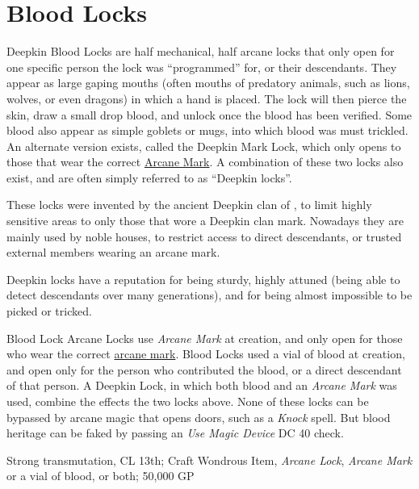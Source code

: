\section{Blood Locks}
\label{sec:Blood Locks}

Deepkin Blood Locks are half mechanical, half arcane locks that only open for
one specific person the lock was ``programmed'' for, or their descendants. They
appear as large gaping mouths (often mouths of predatory animals, such as lions,
wolves, or even dragons) in which a hand is placed. The lock will then pierce
the skin, draw a small drop blood, and unlock once the blood has been verified.
Some blood also appear as simple goblets or mugs, into which blood was must
trickled. An alternate version exists, called the Deepkin Mark Lock, which only
opens to those that wear the correct \hyperref[sec:Arcane Marks]{Arcane Mark}.
A combination of these two locks also exist, and are often simply referred to
as ``Deepkin locks''.

These locks were invented by the ancient Deepkin clan of ,
to limit highly sensitive areas to only those that wore a Deepkin clan mark.
Nowadays they are mainly used by noble houses, to restrict access to direct
descendants, or trusted external members wearing an arcane mark.

Deepkin locks have a reputation for being sturdy, highly attuned (being able
to detect descendants over many generations), and for being almost impossible
to be picked or tricked.

\begin{35e}{Blood Lock}
  Arcane Locks use \emph{Arcane Mark} at creation, and only open for those who
  wear the correct \hyperref[sec:Arcane Marks]{arcane mark}. Blood Locks used
  a vial of blood at creation, and open only for the person who contributed
  the blood, or a direct descendant of that person. A Deepkin Lock, in which
  both blood and an \emph{Arcane Mark} was used, combine the effects the two
  locks above. None of these locks can be bypassed by arcane magic that opens
  doors, such as a \emph{Knock} spell. But blood heritage can be faked by
  passing an \emph{Use Magic Device} DC 40 check.

  Strong transmutation, CL 13th; Craft Wondrous Item, \emph{Arcane Lock},
  \emph{Arcane Mark} or a vial of blood, or both; 50,000 GP
\end{35e}
